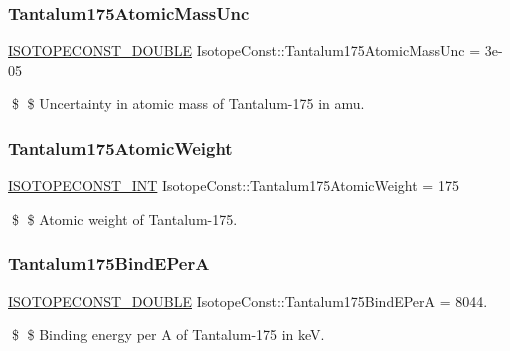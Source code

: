 \subsubsection{\texorpdfstring{Tantalum175\+Atomic\+Mass\+Unc}{Tantalum175AtomicMassUnc}}
{\footnotesize\ttfamily \mbox{\hyperlink{group___isotope_const-_macros_ga8f45a7272ce02c0b4c65c44636ed719a}{I\+S\+O\+T\+O\+P\+E\+C\+O\+N\+S\+T\+\_\+\+D\+O\+U\+B\+LE}} Isotope\+Const\+::\+Tantalum175\+Atomic\+Mass\+Unc = 3e-\/05}

\$ \$ Uncertainty in atomic mass of Tantalum-\/175 in amu. \mbox{\label{group___isotope_const-_tantalum-_ta175_ga51aef6612ccdb4948de19bd0b11a305d}} 
\subsubsection{\texorpdfstring{Tantalum175\+Atomic\+Weight}{Tantalum175AtomicWeight}}
{\footnotesize\ttfamily \mbox{\hyperlink{group___isotope_const-_macros_ga5f18360b3e99483a35c32d789e62621c}{I\+S\+O\+T\+O\+P\+E\+C\+O\+N\+S\+T\+\_\+\+I\+NT}} Isotope\+Const\+::\+Tantalum175\+Atomic\+Weight = 175}

\$ \$ Atomic weight of Tantalum-\/175. \mbox{\label{group___isotope_const-_tantalum-_ta175_ga8eb92b290c238be8549d0d4c320a1f29}} 
\subsubsection{\texorpdfstring{Tantalum175\+Bind\+E\+PerA}{Tantalum175BindEPerA}}
{\footnotesize\ttfamily \mbox{\hyperlink{group___isotope_const-_macros_ga8f45a7272ce02c0b4c65c44636ed719a}{I\+S\+O\+T\+O\+P\+E\+C\+O\+N\+S\+T\+\_\+\+D\+O\+U\+B\+LE}} Isotope\+Const\+::\+Tantalum175\+Bind\+E\+PerA = 8044.}

\$ \$ Binding energy per A of Tantalum-\/175 in keV. \mbox{\label{group___isotope_const-_tantalum-_ta175_ga2fa746a2b1d5850c76c090640f710dae}} 
